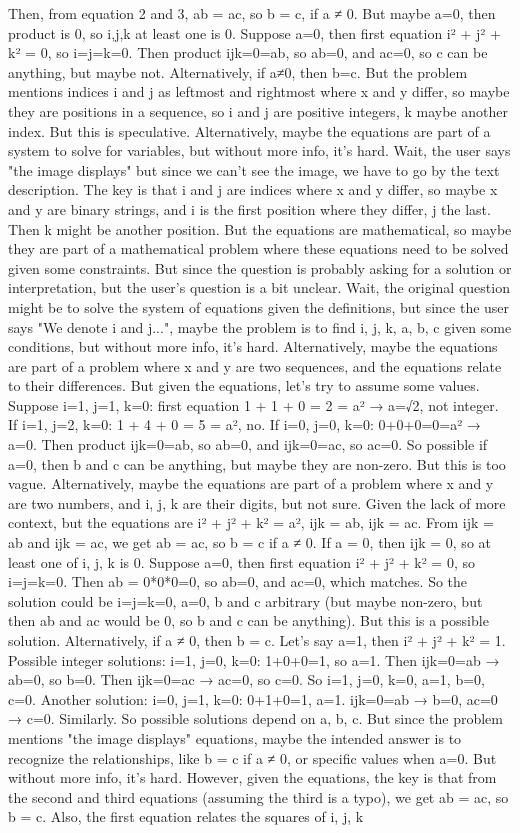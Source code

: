 Then, from equation 2 and 3, ab = ac, so b = c, if a ≠ 0. But maybe a=0, then product is 0, so i,j,k at least one is 0. Suppose a=0, then first equation i² + j² + k² = 0, so i=j=k=0. Then product ijk=0=ab, so ab=0, and ac=0, so c can be anything, but maybe not. Alternatively, if a≠0, then b=c. But the problem mentions indices i and j as leftmost and rightmost where x and y differ, so maybe they are positions in a sequence, so i and j are positive integers, k maybe another index. But this is speculative. Alternatively, maybe the equations are part of a system to solve for variables, but without more info, it's hard. Wait, the user says "the image displays" but since we can't see the image, we have to go by the text description. The key is that i and j are indices where x and y differ, so maybe x and y are binary strings, and i is the first position where they differ, j the last. Then k might be another position. But the equations are mathematical, so maybe they are part of a mathematical problem where these equations need to be solved given some constraints. But since the question is probably asking for a solution or interpretation, but the user's question is a bit unclear. Wait, the original question might be to solve the system of equations given the definitions, but since the user says "We denote i and j...", maybe the problem is to find i, j, k, a, b, c given some conditions, but without more info, it's hard. Alternatively, maybe the equations are part of a problem where x and y are two sequences, and the equations relate to their differences. But given the equations, let's try to assume some values. Suppose i=1, j=1, k=0: first equation 1 + 1 + 0 = 2 = a² → a=√2, not integer. If i=1, j=2, k=0: 1 + 4 + 0 = 5 = a², no. If i=0, j=0, k=0: 0+0+0=0=a² → a=0. Then product ijk=0=ab, so ab=0, and ijk=0=ac, so ac=0. So possible if a=0, then b and c can be anything, but maybe they are non-zero. But this is too vague. Alternatively, maybe the equations are part of a problem where x and y are two numbers, and i, j, k are their digits, but not sure. Given the lack of more context, but the equations are i² + j² + k² = a², ijk = ab, ijk = ac. From ijk = ab and ijk = ac, we get ab = ac, so b = c if a ≠ 0. If a = 0, then ijk = 0, so at least one of i, j, k is 0. Suppose a=0, then first equation i² + j² + k² = 0, so i=j=k=0. Then ab = 0*0*0=0, so ab=0, and ac=0, which matches. So the solution could be i=j=k=0, a=0, b and c arbitrary (but maybe non-zero, but then ab and ac would be 0, so b and c can be anything). But this is a possible solution. Alternatively, if a ≠ 0, then b = c. Let's say a=1, then i² + j² + k² = 1. Possible integer solutions: i=1, j=0, k=0: 1+0+0=1, so a=1. Then ijk=0=ab → ab=0, so b=0. Then ijk=0=ac → ac=0, so c=0. So i=1, j=0, k=0, a=1, b=0, c=0. Another solution: i=0, j=1, k=0: 0+1+0=1, a=1. ijk=0=ab → b=0, ac=0 → c=0. Similarly. So possible solutions depend on a, b, c. But since the problem mentions "the image displays" equations, maybe the intended answer is to recognize the relationships, like b = c if a ≠ 0, or specific values when a=0. But without more info, it's hard. However, given the equations, the key is that from the second and third equations (assuming the third is a typo), we get ab = ac, so b = c. Also, the first equation relates the squares of i, j, k 